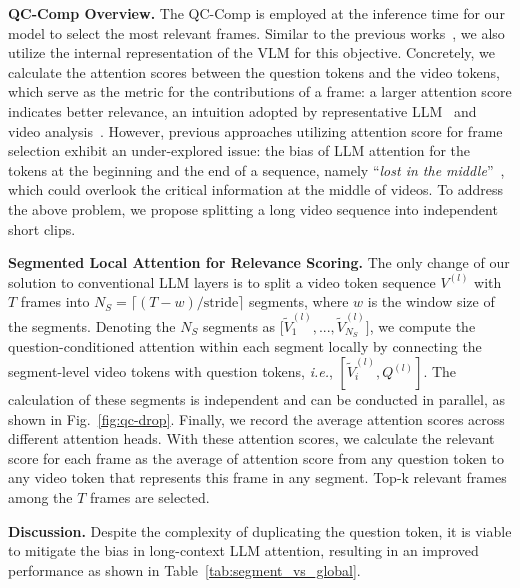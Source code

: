 \noindent\textbf{QC-Comp Overview.}\;\; The QC-Comp is employed at the inference time for our model to select the most relevant frames. Similar to the previous works~\cite{park2024too, buch2022revisiting, wang2024videotree, fan2024videoagent}, we also utilize the internal representation of the VLM for this objective. Concretely, we calculate the attention scores between the question tokens and the video tokens, which serve as the metric for the contributions of a frame: a larger attention score indicates better relevance, an intuition adopted by representative LLM~\cite{wu2024retrieval} and video analysis~\cite{zhou2024rmem}. However, previous approaches utilizing attention score for frame selection exhibit an under-explored issue: the bias of LLM attention for the tokens at the beginning and the end of a sequence, namely ``\emph{lost in the middle}''~\cite{liu2023lost}, which could overlook the critical information at the middle of videos. To address the above problem, we propose splitting a long video sequence into independent short clips.


\noindent\textbf{Segmented Local Attention for Relevance Scoring.}\;\; The only change of our solution to conventional LLM layers is to split a video token sequence $V^{(l)}$ with $T$ frames into $N_S=\lceil (T-w)/\mathrm{stride}\rceil$ segments, where $w$ is the window size of the segments. Denoting the $N_S$ segments as $\big [ \tilde{V}^{(l)}_{1}, ..., \tilde{V}^{(l)}_{N_S}\big ]$, we compute the question-conditioned attention within each segment locally by connecting the segment-level video tokens with question tokens, \emph{i.e.}, $[\tilde{V}^{(l)}_{i}, Q^{(l)}]$. The calculation of these segments is independent and can be conducted in parallel, as shown in Fig.~\ref{fig:qc-drop}. Finally, we record the average attention scores across different attention heads. With these attention scores, we calculate the relevant score for each frame as the average of attention score from any question token to any video token that represents this frame in any segment. Top-k relevant frames among the $T$ frames are selected.

\noindent\textbf{Discussion.}\;\;  Despite the complexity of duplicating the question token, it is viable to mitigate the bias in long-context LLM attention, resulting in an improved performance as shown in Table~\ref{tab:segment_vs_global}.

